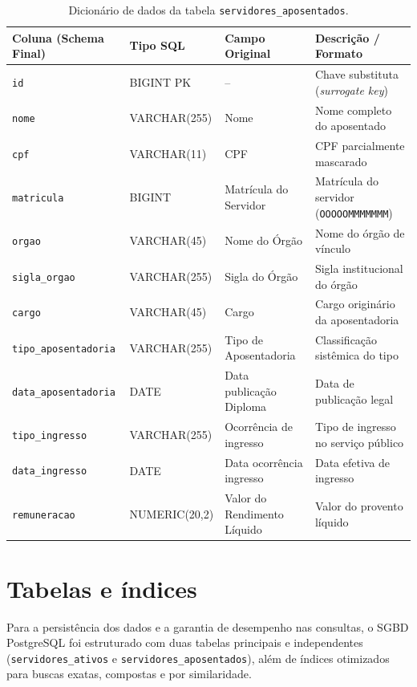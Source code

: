 \documentclass[12pt,a4paper]{article}
\begin{document}
\begin{table}[H]
\centering
\caption{Dicionário de dados da tabela \texttt{servidores\_aposentados}.}
\label{tab:dicionario_aposentados}
\small
\setlength{\tabcolsep}{4pt}
\begin{tabularx}{\textwidth}{l l l X}
\toprule
\textbf{Coluna (Schema Final)} & \textbf{Tipo SQL} & \textbf{Campo Original} & \textbf{Descrição / Formato} \\
\midrule
\texttt{id} & BIGINT PK & -- & Chave substituta (\textit{surrogate key}) \\
\texttt{nome} & VARCHAR(255) & Nome & Nome completo do aposentado \\
\texttt{cpf} & VARCHAR(11) & CPF & CPF parcialmente mascarado \\
\texttt{matricula} & BIGINT & Matrícula do Servidor & Matrícula do servidor (\texttt{OOOOOMMMMMMM}) \\
\texttt{orgao} & VARCHAR(45) & Nome do Órgão & Nome do órgão de vínculo \\
\texttt{sigla\_orgao} & VARCHAR(255) & Sigla do Órgão & Sigla institucional do órgão \\
\texttt{cargo} & VARCHAR(45) & Cargo & Cargo originário da aposentadoria \\
\texttt{tipo\_aposentadoria} & VARCHAR(255) & Tipo de Aposentadoria & Classificação sistêmica do tipo \\
\texttt{data\_aposentadoria} & DATE & Data publicação Diploma & Data de publicação legal \\
\texttt{tipo\_ingresso} & VARCHAR(255) & Ocorrência de ingresso & Tipo de ingresso no serviço público \\
\texttt{data\_ingresso} & DATE & Data ocorrência ingresso & Data efetiva de ingresso \\
\texttt{remuneracao} & NUMERIC(20,2) & Valor do Rendimento Líquido & Valor do provento líquido \\
\bottomrule
\end{tabularx}
\end{table}

\clearpage

\section{Tabelas e índices}

Para a persistência dos dados e a garantia de desempenho nas consultas, o SGBD PostgreSQL foi estruturado com duas tabelas principais e independentes (\texttt{servidores\_ativos} e \texttt{servidores\_aposentados}), além de índices otimizados para buscas exatas, compostas e por similaridade.
\end{document}
